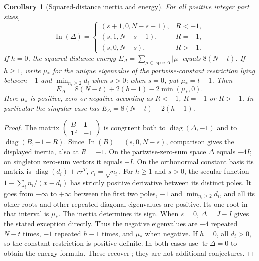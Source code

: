 \documentclass[11pt]{article}
\newtheorem{corollary}[theorem]{Corollary}
\newcommand{\In}{\operatorname{In}}
\newcommand{\diag}{\operatorname{diag}}
\newcommand{\one}{\mathbf{1}}
\begin{document}
\begin{corollary}[Squared-distance inertia and energy]\label{cor:delta}
For all positive integer part sizes,
\[
 \In(\Delta)=\begin{cases}
 (s+1,0,N-s-1),&R<-1,\\
 (s,1,N-s-1),&R=-1,\\
 (s,0,N-s),&R>-1.
 \end{cases}
\]
If $h=0$, the squared-distance energy
$E_\Delta=\sum_{\mu\in\operatorname{spec}\Delta}|\mu|$ equals $8(N-t)$.
If $h\ge1$, write $\mu_*$ for the unique eigenvalue of the
partwise-constant restriction lying between $-1$ and
$\min_{n_i\ge2}d_i$ when $s>0$; when $s=0$, put $\mu_*=t-1$.
Then
\[
 E_\Delta=8(N-t)+2(h-1)-2\min(\mu_*,0).
\]
Here $\mu_*$ is positive, zero or negative according as $R<-1$,
$R=-1$ or $R>-1$. In particular the singular case has
$E_\Delta=8(N-t)+2(h-1)$.
\end{corollary}
\begin{proof}
The matrix
$\left(\begin{smallmatrix}B&\one\\\one^T&-1\end{smallmatrix}\right)$
is congruent both to $\diag(\Delta,-1)$ and to
$\diag(B,-1-R)$. Since $\In(B)=(s,0,N-s)$,
comparison gives the displayed inertia, also at $R=-1$.
On the partwise-zero-sum space $\Delta$ equals $-4I$; on singleton
zero-sum vectors it equals $-I$.
On the orthonormal constant basis its matrix is
$\diag(d_i)+rr^T$, $r_i=\sqrt{n_i}$.
For $h\ge1$ and $s>0$, the secular function
$1-\sum_i n_i/(x-d_i)$ has strictly positive derivative between its
distinct poles. It goes from $-\infty$ to $+\infty$ between the first
two poles, $-1$ and $\min_{n_i\ge2}d_i$, and all its other roots and
other repeated diagonal eigenvalues are positive. Its one root in that
interval is $\mu_*$. The inertia determines its sign. When $s=0$,
$\Delta=J-I$ gives the stated exception directly. Thus the negative
eigenvalues are $-4$ repeated $N-t$ times, $-1$ repeated $h-1$ times,
and $\mu_*$ when negative. If $h=0$, all $d_i>0$, so the constant
restriction is positive definite. In both cases use
$\operatorname{tr}\Delta=0$ to obtain the energy formula.
These recover \cite[Theorems~4.1 and~4.5]{DMspectral}; they are not
additional conjectures.
\end{proof}
\end{document}
